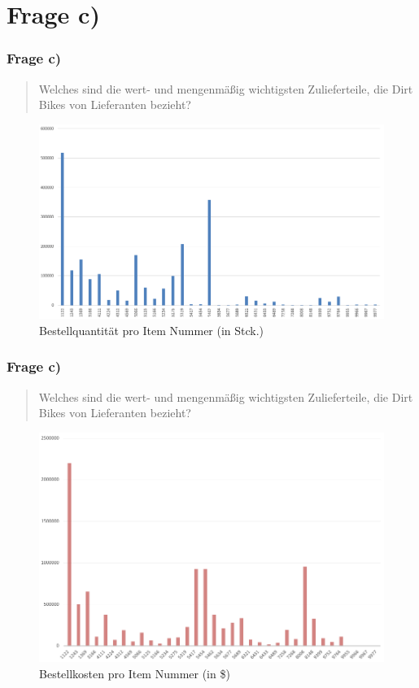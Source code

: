 \documentclass{beamer}
\begin{document}
\section{Frage c)}
\begin{frame}
\frametitle{Frage c)}

\begin{quote}
Welches sind die wert- und mengenm\"aßig wichtigsten Zulieferteile, die Dirt Bikes von Lieferanten bezieht?
\end{quote}

\begin{figure}
\includegraphics[scale=0.43]{pivot_itemNO_quantity.PNG}
\caption{Bestellquantit\"at pro Item Nummer (in Stck.)}
\end{figure}

\end{frame}

\begin{frame}
\frametitle{Frage c)}

\begin{quote}
Welches sind die wert- und mengenm\"aßig wichtigsten Zulieferteile, die Dirt Bikes von Lieferanten bezieht?
\end{quote}

\begin{figure}
\includegraphics[scale=0.40]{pivot_itemNO_costs.PNG}
\caption{Bestellkosten pro Item Nummer (in \$)}
\end{figure}

\end{frame}
\end{document}
